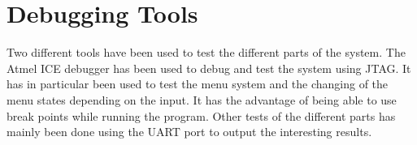 \section{Debugging Tools}
Two different tools have been used to test the different parts of the system. 
The Atmel ICE debugger has been used to debug and test the system using JTAG. 
It has in particular been used to test the menu system and the changing of the menu states depending on the input. 
It has the advantage of being able to use break points while running the program. 
Other tests of the different parts has mainly been done using the UART port to output the interesting results.

